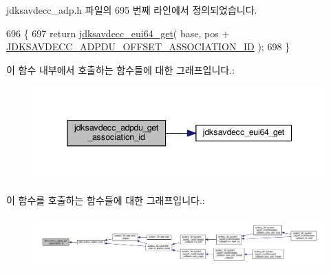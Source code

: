 jdksavdecc\+\_\+adp.\+h 파일의 695 번째 라인에서 정의되었습니다.


\begin{DoxyCode}
696 \{
697     \textcolor{keywordflow}{return} \hyperlink{group__eui64_ga2652311a25a6b91cddbed75c108c7031}{jdksavdecc\_eui64\_get}( base, pos + 
      \hyperlink{group__adpdu_gad85e8e78a5189255a429b5bfe4b1751c}{JDKSAVDECC\_ADPDU\_OFFSET\_ASSOCIATION\_ID} );
698 \}
\end{DoxyCode}


이 함수 내부에서 호출하는 함수들에 대한 그래프입니다.\+:
\nopagebreak
\begin{figure}[H]
\begin{center}
\leavevmode
\includegraphics[width=345pt]{group__adpdu_ga033e6dd0b16beee436f9d8cb2c0bfd70_cgraph}
\end{center}
\end{figure}




이 함수를 호출하는 함수들에 대한 그래프입니다.\+:
\nopagebreak
\begin{figure}[H]
\begin{center}
\leavevmode
\includegraphics[width=350pt]{group__adpdu_ga033e6dd0b16beee436f9d8cb2c0bfd70_icgraph}
\end{center}
\end{figure}


